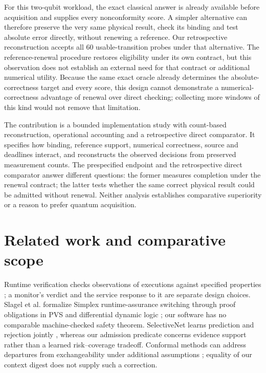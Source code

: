 \documentclass[pdflatex,sn-mathphys-num]{sn-jnl}
\begin{document}
For this two-qubit workload, the exact classical answer is already available before acquisition and supplies every nonconformity score. A simpler alternative can therefore preserve the very same physical result, check its binding and test absolute error directly, without renewing a reference. Our retrospective reconstruction accepts all 60 usable-transition probes under that alternative. The reference-renewal procedure restores eligibility under its own contract, but this observation does not establish an external need for that contract or additional numerical utility. Because the same exact oracle already determines the absolute-correctness target and every score, this design cannot demonstrate a numerical-correctness advantage of renewal over direct checking; collecting more windows of this kind would not remove that limitation.

The contribution is a bounded implementation study with count-based reconstruction, operational accounting and a retrospective direct comparator. It specifies how binding, reference support, numerical correctness, source and deadlines interact, and reconstructs the observed decisions from preserved measurement counts. The prespecified endpoint and the retrospective direct comparator answer different questions: the former measures completion under the renewal contract; the latter tests whether the same correct physical result could be admitted without renewal. Neither analysis establishes comparative superiority or a reason to prefer quantum acquisition.

\section{Related work and comparative scope}
Runtime verification checks observations of executions against specified properties \cite{leucker2009brief}; a monitor's verdict and the service response to it are separate design choices. Slagel et al. formalize Simplex runtime-assurance switching through proof obligations in PVS and differential dynamic logic \cite{slagel}; our software has no comparable machine-checked safety theorem. SelectiveNet learns prediction and rejection jointly \cite{selective}, whereas our admission predicate concerns evidence support rather than a learned risk--coverage tradeoff. Conformal methods can address departures from exchangeability under additional assumptions \cite{barber}; equality of our context digest does not supply such a correction.
\end{document}
